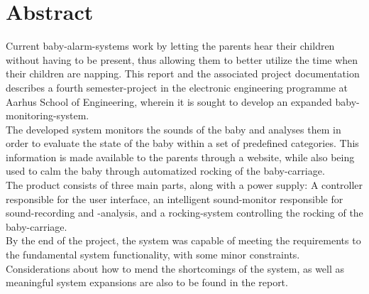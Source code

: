 \chapter{Abstract}

Current baby-alarm-systems work by letting the parents hear their children without having to be present, thus allowing them to better utilize the time when their children are napping.
This report and the associated project documentation describes a fourth semester-project in the electronic engineering programme at Aarhus School of Engineering, wherein it is sought to develop an expanded baby-monitoring-system.\\
The developed system monitors the sounds of the baby and analyses them in order to evaluate the state of the baby within a set of predefined categories. This information is made available to the parents through a website, while also being used to calm the baby through automatized rocking of the baby-carriage.\\
The product consists of three main parts, along with a power supply: A controller responsible for the user interface, an intelligent sound-monitor responsible for sound-recording and -analysis, and a rocking-system controlling the rocking of the baby-carriage.\\
By the end of the project, the system was capable of meeting the requirements to the fundamental system functionality, with some minor constraints. Considerations about how to mend the shortcomings of the system, as well as meaningful system expansions are also to be found in the report.\\

